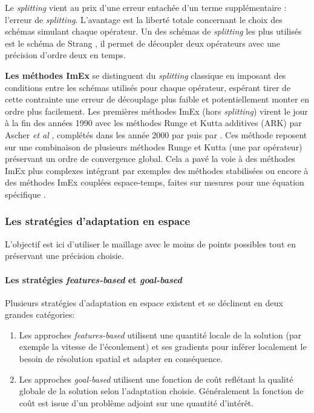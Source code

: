         Le \textit{splitting} vient au prix d'une erreur entachée d'un terme supplémentaire : l'erreur de \textit{splitting}.
        L'avantage est la liberté totale concernant le choix des schémas simulant chaque opérateur.
        Un des schémas de \textit{splitting} les plus utilisés est le schéma de Strang \cite{Strang1968}, 
        il permet de découpler deux opérateurs avec une précision d'ordre deux en temps.\par
        \textbf{Les méthodes ImEx} se distinguent du \textit{splitting} classique en imposant des conditions entre les schémas utilisés pour chaque opérateur, 
        espérant tirer de cette contrainte une erreur de découplage plus faible et potentiellement monter en ordre plus facilement.
        Les premières méthodes ImEx (hors \textit{splitting}) virent le jour à la fin des années 1990 
        avec les méthodes Runge et Kutta additives (ARK) par Ascher \textit{et al} \cite{ASCHER1997151},
        complétés dans les année 2000 par \cite{KENNEDY2003139} puis par \cite{pareschi2010implicitexplicitrungekuttaschemesapplications}.
        Ces méthode reposent sur une combinaison de plusieurs méthodes Runge et Kutta (une par opérateur) préservant un ordre de convergence global.
        Cela a pavé la voie à des méthodes ImEx plus complexes intégrant par exemples des méthodes stabilisées \cite{Abdulle2013} 
        ou encore à des méthodes ImEx couplées espace-temps, faites sur mesures pour une équation spécifique \cite{rebou2024}.
    \subsubsection{Les stratégies d'adaptation en espace}
        L'objectif est ici d'utiliser le maillage avec le moins de points possibles tout en préservant une précision choisie.
        \paragraph{Les stratégies \textit{features-based} et \textit{goal-based}}
        Plusieurs stratégies d'adaptation en espace existent et se déclinent en deux grandes catégories\cite{Vivarelli2025Fluids}:
        \begin{enumerate}
            \item Les approches \textit{features-based} utilisent une quantité locale de la solution (par exemple la vitesse de l'écoulement) 
            et ses gradients pour inférer localement le besoin de résolution spatial et adapter en conséquence.
            \item Les approches \textit{goal-based} utilisent une fonction de coût reflétant la qualité globale de la solution selon l'adaptation choisie.
            Généralement la fonction de coût est issue d'un problème adjoint sur une quantité d'intérêt.
        \end{enumerate}
